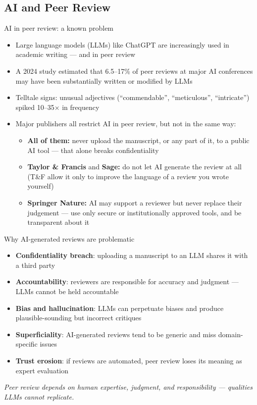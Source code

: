\documentclass[aspectratio=169]{beamer}
\begin{document}
\subsection{AI and Peer Review}

\begin{frame}{AI in peer review: a known problem}
\begin{itemize}
  \item Large language models (LLMs) like ChatGPT are increasingly used in academic writing — and in peer review
  \item A 2024 study estimated that 6.5–17\% of peer reviews at major AI conferences may have been substantially written or modified by LLMs \citep{liang2024aireviews}
  \item Telltale signs: unusual adjectives (``commendable'', ``meticulous'', ``intricate'') spiked 10–35× in frequency
  \item Major publishers all restrict AI in peer review, but not in the same way:
    \begin{itemize}
      \item \textbf{All of them:} never upload the manuscript, or any part of it, to a public AI tool --- that alone breaks confidentiality
      \item \textbf{Taylor \& Francis} and \textbf{Sage:} do not let AI generate the review at all (T\&F allow it only to improve the language of a review you wrote yourself)
      \item \textbf{Springer Nature:} AI may support a reviewer but never replace their judgement --- use only secure or institutionally approved tools, and be transparent about it
    \end{itemize}
\end{itemize}
\end{frame}

\begin{frame}{Why AI-generated reviews are problematic}
\begin{itemize}
  \item \textbf{Confidentiality breach}: uploading a manuscript to an LLM shares it with a third party
  \item \textbf{Accountability}: reviewers are responsible for accuracy and judgment — LLMs cannot be held accountable
  \item \textbf{Bias and hallucination}: LLMs can perpetuate biases and produce plausible-sounding but incorrect critiques
  \item \textbf{Superficiality}: AI-generated reviews tend to be generic and miss domain-specific issues
  \item \textbf{Trust erosion}: if reviews are automated, peer review loses its meaning as expert evaluation
\end{itemize}
\medskip
\textit{Peer review depends on human expertise, judgment, and responsibility — qualities LLMs cannot replicate.}
\end{frame}
\end{document}
